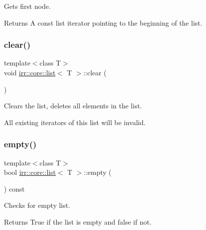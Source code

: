 Gets first node. 

\begin{DoxyReturn}{Returns}
A const list iterator pointing to the beginning of the list. 
\end{DoxyReturn}
\mbox{\label{classirr_1_1core_1_1list_aad18996ed41454bf7bb8e1d3199f4e73}} 
\subsubsection{\texorpdfstring{clear()}{clear()}}
{\footnotesize\ttfamily template$<$class T$>$ \\
void \hyperlink{classirr_1_1core_1_1list}{irr\+::core\+::list}$<$ T $>$\+::clear (\begin{DoxyParamCaption}{ }\end{DoxyParamCaption})\hspace{0.3cm}{\ttfamily [inline]}}



Clears the list, deletes all elements in the list. 

All existing iterators of this list will be invalid. \mbox{\label{classirr_1_1core_1_1list_aa0958447b2269fff0d650cb464ba84bd}} 
\subsubsection{\texorpdfstring{empty()}{empty()}}
{\footnotesize\ttfamily template$<$class T$>$ \\
bool \hyperlink{classirr_1_1core_1_1list}{irr\+::core\+::list}$<$ T $>$\+::empty (\begin{DoxyParamCaption}{ }\end{DoxyParamCaption}) const\hspace{0.3cm}{\ttfamily [inline]}}



Checks for empty list. 

\begin{DoxyReturn}{Returns}
True if the list is empty and false if not. 
\end{DoxyReturn}
\mbox{\label{classirr_1_1core_1_1list_aa80509dac5224fa57cc548e39480a115}} 
